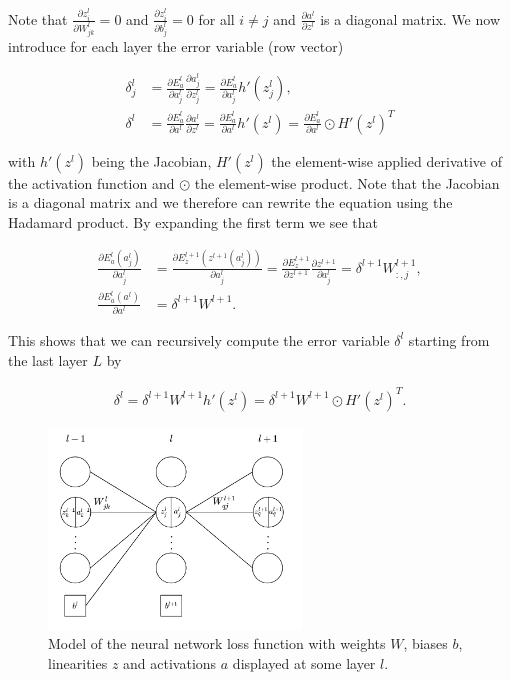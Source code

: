 \documentclass[english,11pt,a4paper]{article}
\begin{document}
Note that $\frac{\partial z^l_i}{\partial W^l_{jk}} = 0$ and $\frac{\partial z^l_i}{\partial b_j^l} = 0$ for all $i \neq j$ and $\frac{\partial a^l}{\partial z^l}$ is a diagonal matrix. We now introduce for each layer the error variable (row vector)

\begin{equation}
	\begin{aligned}
		\delta^l_j &= \frac{\partial E^l_a}{\partial a^l_j} \frac{\partial a^l_j}{\partial z^l_j} =
		\frac{\partial E^l_a}{\partial a^l_j} h'(z^l_j), \\
		\delta^l &= \frac{\partial E^l_a}{\partial a^l} \frac{\partial a^l}{\partial z^l} =
		\frac{\partial E^l_a}{\partial a^l} h'(z^l) = \frac{\partial E^l_a}{\partial a^l} \odot H'(z^l)^T
	\end{aligned}
\end{equation}

with $h'(z^l)$ being the Jacobian, $H'(z^l)$ the element-wise applied derivative of the activation function and $\odot$ the element-wise product. Note that the Jacobian is a diagonal matrix and we therefore can rewrite the equation using the Hadamard product. By expanding the first term we see that

\begin{equation}
	\begin{aligned}
		\frac{\partial E^l_a(a^l_j)}{\partial a^l_j} &= 
		\frac{\partial E^{l+1}_z(z^{l+1}(a^l_j))}{\partial a^l_j} = 
		\frac{\partial E^{l+1}_z}{\partial z^{l+1}} \frac{\partial z^{l+1}}{\partial a^l_j} = 
		\delta^{l+1}W^{l+1}_{:,j}, \\
		\frac{\partial E^l_a(a^l)}{\partial a^l} &= \delta^{l+1}W^{l+1}.
	\end{aligned}
\end{equation}

This shows that we can recursively compute the error variable $\delta^l$ starting from the last layer $L$ by

\begin{equation}
	\begin{aligned}
		\delta^l = \delta^{l+1}W^{l+1} h'(z^l) = \delta^{l+1}W^{l+1} \odot H'(z^l)^T.
	\end{aligned}
\end{equation}

\begin{figure}[t]
	\centering
	\includegraphics[width=0.6\textwidth]{images/backprop}
	\caption{Model of the neural network loss function with weights $W$, biases $b$, linearities $z$ and activations $a$ displayed at some layer $l$.}
	\label{fig:backprop}
\end{figure}
\end{document}
